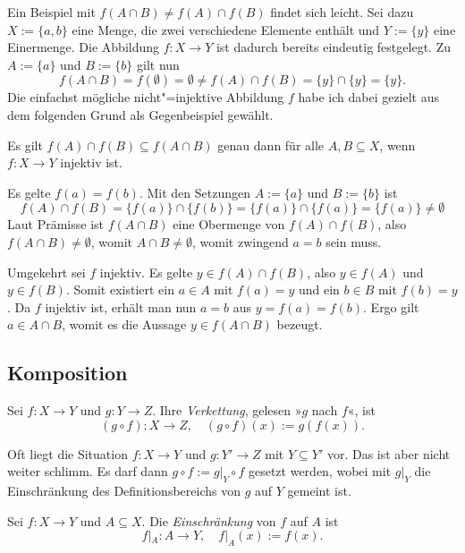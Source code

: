 \noindent
Ein Beispiel mit $f(A\cap B)\ne f(A)\cap f(B)$ findet sich leicht.
Sei dazu $X:=\{a,b\}$ eine Menge, die zwei verschiedene Elemente
enthält und $Y:=\{y\}$ eine Einermenge. Die Abbildung $f\colon X\to Y$
ist dadurch bereits eindeutig festgelegt. Zu $A:=\{a\}$ und $B:=\{b\}$
gilt nun
\[f(A\cap B) = f(\emptyset) = \emptyset \ne f(A)\cap f(B) = \{y\}\cap\{y\} = \{y\}.\]
Die einfachst mögliche nicht"=injektive Abbildung $f$ habe ich dabei
gezielt aus dem folgenden Grund als Gegenbeispiel gewählt.

\begin{Satz}
Es gilt $f(A)\cap f(B)\subseteq f(A\cap B)$ genau dann für alle $A,B\subseteq X$,
wenn $f\colon X\to Y$ injektiv ist.
\end{Satz}
\begin{Beweis}
Es gelte $f(a)=f(b)$. Mit den Setzungen $A:=\{a\}$ und $B:=\{b\}$ ist
\[f(A)\cap f(B) = \{f(a)\}\cap\{f(b)\} = \{f(a)\}\cap\{f(a)\} = \{f(a)\}\ne\emptyset\]
Laut Prämisse ist $f(A\cap B)$ eine Obermenge von $f(A)\cap f(B)$,
also $f(A\cap B)\ne\emptyset$, womit $A\cap B\ne\emptyset$, womit
zwingend $a=b$ sein muss.

Umgekehrt sei $f$ injektiv. Es gelte $y\in f(A)\cap f(B)$, also
$y\in f(A)$ und $y\in f(B)$. Somit existiert ein $a\in A$ mit
$f(a)=y$ und ein $b\in B$ mit $f(b)=y$. Da $f$ injektiv ist,
erhält man nun $a=b$ aus $y=f(a)=f(b)$. Ergo gilt $a\in A\cap B$,
womit es die Aussage $y\in f(A\cap B)$ bezeugt.\,\qedsymbol
\end{Beweis}

\subsection{Komposition}

\begin{Definition}[Komposition]\newlinefirst
Sei $f\colon X\to Y$ und $g\colon Y\to Z$. Ihre
\emph{Verkettung},
gelesen »$g$ nach $f$«, ist%
\[(g\circ f)\colon X\to Z,\quad (g\circ f)(x):=g(f(x)).\]
\end{Definition}

\noindent
Oft liegt die Situation $f\colon X\to Y$ und $g\colon Y'\to Z$
mit $Y\subseteq Y'$ vor. Das ist aber nicht weiter schlimm. Es
darf dann $g\circ f := g|_Y\circ f$ gesetzt werden, wobei mit $g|_Y$ die
Einschränkung des Definitionsbereichs von $g$ auf $Y$ gemeint ist.

\begin{Definition}[Einschränkung]\newlinefirst
Sei $f\colon X\to Y$ und $A\subseteq X$. Die \emph{Einschränkung} von
$f$ auf $A$ ist%
\[f|_A\colon A\to Y,\quad f|_A(x):=f(x).\]
\end{Definition}

